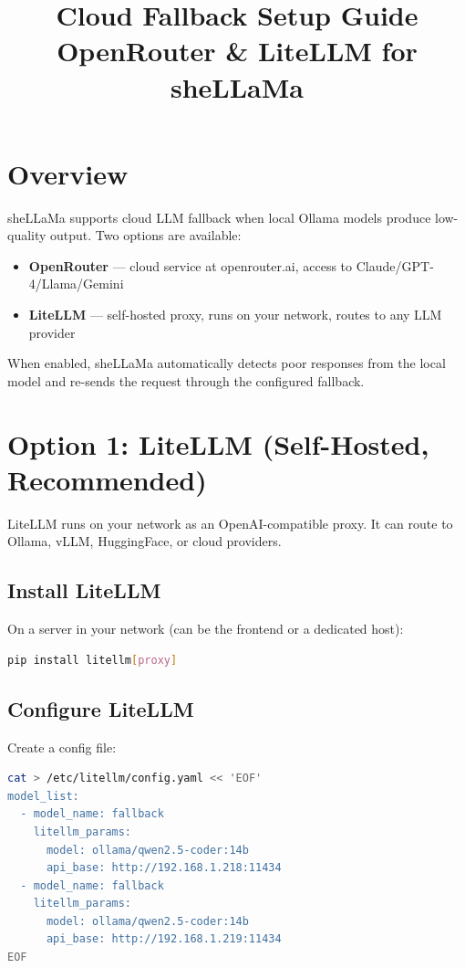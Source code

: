 \documentclass[11pt,a4paper]{article}
\title{\textbf{Cloud Fallback Setup Guide}\\[4pt]\large OpenRouter \& LiteLLM for sheLLaMa}
\author{}
\date{}
\begin{document}
\maketitle
\thispagestyle{fancy}

\section{Overview}

sheLLaMa supports cloud LLM fallback when local Ollama models produce low-quality output. Two options are available:

\begin{itemize}
  \item \textbf{OpenRouter} --- cloud service at openrouter.ai, access to Claude/GPT-4/Llama/Gemini
  \item \textbf{LiteLLM} --- self-hosted proxy, runs on your network, routes to any LLM provider
\end{itemize}

When enabled, sheLLaMa automatically detects poor responses from the local model and re-sends the request through the configured fallback.

\section{Option 1: LiteLLM (Self-Hosted, Recommended)}

LiteLLM runs on your network as an OpenAI-compatible proxy. It can route to Ollama, vLLM, HuggingFace, or cloud providers.

\subsection{Install LiteLLM}

On a server in your network (can be the frontend or a dedicated host):

\begin{lstlisting}[language=bash]
pip install litellm[proxy]
\end{lstlisting}

\subsection{Configure LiteLLM}

Create a config file:

\begin{lstlisting}[language=bash]
cat > /etc/litellm/config.yaml << 'EOF'
model_list:
  - model_name: fallback
    litellm_params:
      model: ollama/qwen2.5-coder:14b
      api_base: http://192.168.1.218:11434
  - model_name: fallback
    litellm_params:
      model: ollama/qwen2.5-coder:14b
      api_base: http://192.168.1.219:11434
EOF
\end{lstlisting}
\end{document}

